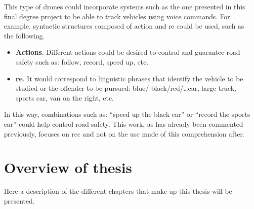 This type of drones could incorporate systems such as the one presented in this
final degree project to be able to track vehicles using voice commands. For
example, syntactic structures composed of action and \gls{re} could be used,
such as the following.

\begin{itemize}
  \item \textbf{Actions}. Different actions could be desired to control and
  guarantee road safety such as: follow, record, speed up, etc.
  \item \textbf{\gls*{re}}. It would correspond to linguistic phrases that
  identify the vehicle to be studied or the offender to be pursued: blue/
  black/red/\ldots car, large truck, sports car, van on the right, etc.
\end{itemize}

In this way, combinations such as: ``speed up the black car'' or ``record the
sports car'' could help control road safety. This work, as has already been
commented previously, focuses on \gls{rec} and not on the use made of this
comprehension after.


\section{Overview of thesis}

Here a description of the different chapters that make up this thesis will be
presented.

